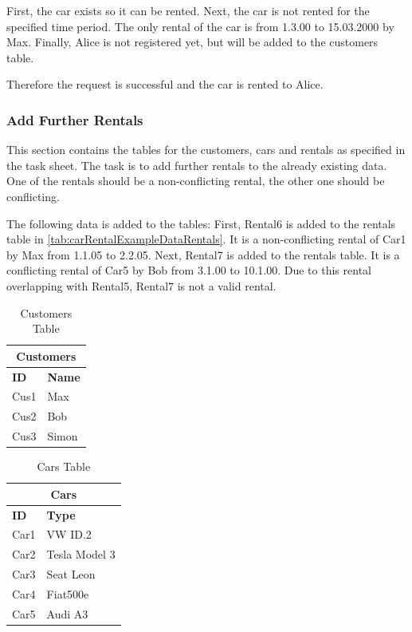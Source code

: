 First, the car exists so it can be rented.
Next, the car is not rented for the specified time period.
The only rental of the car is from 1.3.00 to 15.03.2000 by Max.
Finally, Alice is not registered yet, but will be added to the customers table.

Therefore the request is successful and the car is rented to Alice.

\subsubsection*{Add Further Rentals}
This section contains the tables for the customers, cars and rentals as specified in the task sheet.
The task is to add further rentals to the already existing data.
One of the rentals should be a non-conflicting rental, the other one should be conflicting.

The following data is added to the tables:
First, Rental6 is added to the rentals table in \autoref{tab:carRentalExampleDataRentals}.
It is a non-conflicting rental of Car1 by Max from 1.1.05 to 2.2.05.
Next, Rental7 is added to the rentals table.
It is a conflicting rental of Car5 by Bob from 3.1.00 to 10.1.00.
Due to this rental overlapping with Rental5, Rental7 is not a valid rental.

\begin{table}[H]
    \centering
    \caption{Customers Table}
    \label{tab:carRentalExampleDataCustomers}
    \begin{tabular}{|p{2cm}|p{2cm}|}
        \hline
        \multicolumn{2}{|c|}{\textbf{Customers}} \\
        \hline
        \textbf{ID} & \textbf{Name} \\
        \hline
        Cus1 & Max \\
        Cus2 & Bob \\
        Cus3 & Simon \\
        \hline
    \end{tabular}
\end{table}

\begin{table}[H]
    \centering
    \caption{Cars Table}
    \label{tab:carRentalExampleDataCars}
    \begin{tabular}{|p{2cm}|p{3cm}|}
        \hline
        \multicolumn{2}{|c|}{\textbf{Cars}} \\
        \hline
        \textbf{ID} & \textbf{Type} \\
        \hline
        Car1 & VW ID.2 \\
        Car2 & Tesla Model 3 \\
        Car3 & Seat Leon \\
        Car4 & Fiat500e \\
        Car5 & Audi A3 \\
        \hline
    \end{tabular}
\end{table}

